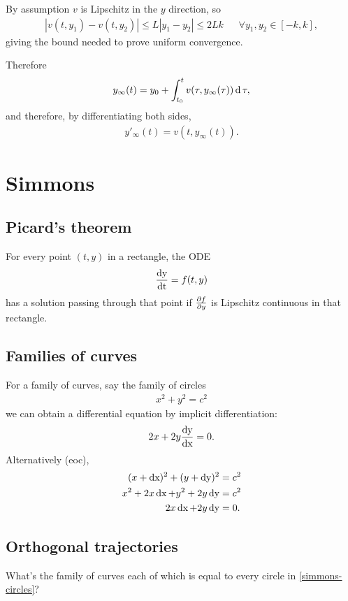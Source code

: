 By assumption $v$ is Lipschitz in the $y$ direction, so
\begin{align*}
  |v(t, y_1) - v(t, y_2)| \leq L|y_1 - y_2| \leq 2Lk ~~~~~~~\forall y_1, y_2 \in [-k, k],
\end{align*}
giving the bound needed to prove uniform convergence.

Therefore
\begin{align*}
  y_\infty(t) = y_0 + \int_{t_0}^t v(\tau, y_\infty(\tau)) \operatorname{\text{d}}\tau,
\end{align*}
and therefore, by differentiating both sides,
\begin{align*}
  y'_\infty(t) = v(t, y_\infty(t)).
\end{align*}


\newpage
\section{Simmons}

\subsection{Picard's theorem}
For every point $(t, y)$ in a rectangle, the ODE
\begin{align*}
  \frac{\operatorname{\text{dy}}}{\operatorname{\text{dt}}} = f(t, y)
\end{align*}
has a solution passing through that point if $\frac{\partial f}{\partial y}$ is Lipschitz
continuous in that rectangle.

\subsection{Families of curves}
For a family of curves, say the family of circles
\begin{align}
  x^2 + y^2 = c^2 \label{simmons-circles}
\end{align}
we can obtain a differential equation by implicit differentiation:
\begin{align}
  2x + 2y\frac{\operatorname{\text{dy}}}{\operatorname{\text{dx}}} = 0. \label{simmons-circles-de}
\end{align}
Alternatively (eoc),
\begin{align*}
  (x + \operatorname{\text{dx}})^2 + (y + \operatorname{\text{dy}})^2 &= c^2\\
  x^2 + 2x\operatorname{\text{dx}} + y^2 + 2y\operatorname{\text{dy}} &= c^2\\
        2x\operatorname{\text{dx}}  + 2y\operatorname{\text{dy}}     &= 0.
\end{align*}

\subsection{Orthogonal trajectories}
What's the family of curves each of which is equal to every circle in \eqref{simmons-circles}?

